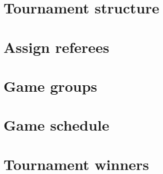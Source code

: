 \documentclass{template/custombook}
\author{Dinal Atapattu}
\begin{document}
    \maketitle
    \tableofcontents
    \chapter{Tournament structure}

    \chapter{Assign referees}

    \chapter{Game groups}

    \chapter{Game schedule}

    \chapter{Tournament winners}
    
\end{document}
